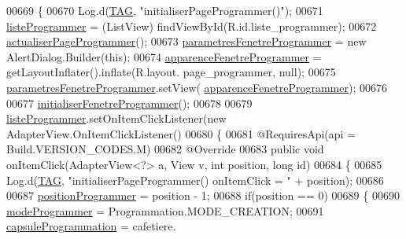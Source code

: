 \begin{DoxyCode}
00669     \{
00670         Log.d(\hyperlink{classcom_1_1example_1_1ekawa_1_1_ihm_a95cd92c2acaf9f8982302da08d94f9aa}{TAG}, \textcolor{stringliteral}{"initialiserPageProgrammer()"});
00671         \hyperlink{classcom_1_1example_1_1ekawa_1_1_ihm_a4fd152e506a6b1130477795d8c2d2a83}{listeProgrammer} = (ListView) findViewById(R.id.liste\_programmer);
00672         \hyperlink{classcom_1_1example_1_1ekawa_1_1_ihm_adbeeac61b5a53c52d21da490659de983}{actualiserPageProgrammer}();
00673         \hyperlink{classcom_1_1example_1_1ekawa_1_1_ihm_a6eb2afb2fe8da7f3a749089c84934145}{parametresFenetreProgrammer} = \textcolor{keyword}{new} AlertDialog.Builder(\textcolor{keyword}{this});
00674         \hyperlink{classcom_1_1example_1_1ekawa_1_1_ihm_aa8beb9a05b4f2c2030b9829642f87d3f}{apparenceFenetreProgrammer} = getLayoutInflater().inflate(R.layout.
      page\_programmer, null);
00675         \hyperlink{classcom_1_1example_1_1ekawa_1_1_ihm_a6eb2afb2fe8da7f3a749089c84934145}{parametresFenetreProgrammer}.setView(
      \hyperlink{classcom_1_1example_1_1ekawa_1_1_ihm_aa8beb9a05b4f2c2030b9829642f87d3f}{apparenceFenetreProgrammer});
00676 
00677         \hyperlink{classcom_1_1example_1_1ekawa_1_1_ihm_a08b1da8fdc68effff9a6da918e14d12d}{initialiserFenetreProgrammer}();
00678 
00679         \hyperlink{classcom_1_1example_1_1ekawa_1_1_ihm_a4fd152e506a6b1130477795d8c2d2a83}{listeProgrammer}.setOnItemClickListener(\textcolor{keyword}{new} AdapterView.OnItemClickListener()
00680         \{
00681             @RequiresApi(api = Build.VERSION\_CODES.M)
00682             @Override
00683             \textcolor{keyword}{public} \textcolor{keywordtype}{void} onItemClick(AdapterView<?> a, View v, \textcolor{keywordtype}{int} position, \textcolor{keywordtype}{long} \textcolor{keywordtype}{id})
00684             \{
00685                 Log.d(\hyperlink{classcom_1_1example_1_1ekawa_1_1_ihm_a95cd92c2acaf9f8982302da08d94f9aa}{TAG}, \textcolor{stringliteral}{"initialiserPageProgrammer() onItemClick = "} + position);
00686 
00687                 \hyperlink{classcom_1_1example_1_1ekawa_1_1_ihm_ada29cde0c67d8614d47b27ed04c337e9}{positionProgrammer} = position - 1;
00688                 \textcolor{keywordflow}{if}(position == 0)
00689                 \{
00690                     \hyperlink{classcom_1_1example_1_1ekawa_1_1_ihm_acc8db4ba4fa39c343412d6ff57c2acbd}{modeProgrammer} = Programmation.MODE\_CREATION;
00691                     \hyperlink{classcom_1_1example_1_1ekawa_1_1_ihm_a2ddf5b95e2a3fbb3a15d160ba266295a}{capsuleProgrammation} = cafetiere.

\end{DoxyCode}
